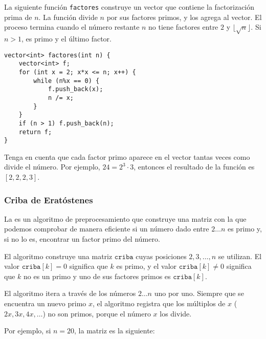 \noindent
La siguiente función \texttt{factores}
construye un vector que contiene la factorización
prima de $n$.
La función divide $n$ por sus factores primos,
y los agrega al vector.
El proceso termina cuando el número restante $n$
no tiene factores entre $2$ y $\lfloor \sqrt n \rfloor$.
Si $n>1$, es primo y el último factor.

\begin{lstlisting}
vector<int> factores(int n) {
    vector<int> f;
    for (int x = 2; x*x <= n; x++) {
        while (n%x == 0) {
            f.push_back(x);
            n /= x;
        }
    }
    if (n > 1) f.push_back(n);
    return f;
}
\end{lstlisting}

Tenga en cuenta que cada factor primo aparece en el vector
tantas veces como divide el número.
Por ejemplo, $24=2^3 \cdot 3$,
entonces el resultado de la función es $[2,2,2,3]$.

\subsubsection{Criba de Eratóstenes}


La 
es un algoritmo de preprocesamiento
que construye una matriz con la que podemos
comprobar de manera eficiente si un número dado entre $2 \ldots n$
es primo y, si no lo es, encontrar un factor primo del número.

El algoritmo construye una matriz $\texttt{criba}$
cuyas posiciones $2,3,\ldots,n$ se utilizan.
El valor $\texttt{criba}[k]=0$ significa
que $k$ es primo,
y el valor $\texttt{criba}[k] \neq 0$
significa que $k$ no es un primo y uno
de sus factores primos es $\texttt{criba}[k]$.

El algoritmo itera a través de los números
$2 \ldots n$ uno por uno.
Siempre que se encuentra un nuevo primo $x$,
el algoritmo registra que los múltiplos
de $x$ ($2x,3x,4x,\ldots$) no son primos,
porque el número $x$ los divide.

Por ejemplo, si $n=20$, la matriz es la siguiente:

